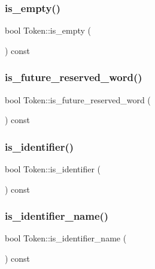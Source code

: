 \subsubsection{\texorpdfstring{is\+\_\+empty()}{is\_empty()}}
{\footnotesize\ttfamily bool Token\+::is\+\_\+empty (\begin{DoxyParamCaption}{ }\end{DoxyParamCaption}) const}

\mbox{\label{class_token_a3744fa3b281fc78d02eae4174119b93d}} 
\subsubsection{\texorpdfstring{is\+\_\+future\+\_\+reserved\+\_\+word()}{is\_future\_reserved\_word()}}
{\footnotesize\ttfamily bool Token\+::is\+\_\+future\+\_\+reserved\+\_\+word (\begin{DoxyParamCaption}{ }\end{DoxyParamCaption}) const}

\mbox{\label{class_token_a3099586a66bb18eafee512ba32f3b75d}} 
\subsubsection{\texorpdfstring{is\+\_\+identifier()}{is\_identifier()}}
{\footnotesize\ttfamily bool Token\+::is\+\_\+identifier (\begin{DoxyParamCaption}{ }\end{DoxyParamCaption}) const}

\mbox{\label{class_token_a00ae85f794f2c6a2da22b1454ecd4e84}} 
\subsubsection{\texorpdfstring{is\+\_\+identifier\+\_\+name()}{is\_identifier\_name()}}
{\footnotesize\ttfamily bool Token\+::is\+\_\+identifier\+\_\+name (\begin{DoxyParamCaption}{ }\end{DoxyParamCaption}) const}

